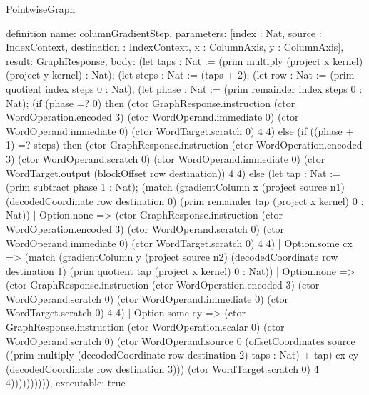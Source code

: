 \begin{lexlean}{PointwiseGraph}
\begin{semanticmodule}
definition{
  name: columnGradientStep,
  parameters: [index : Nat, source : IndexContext, destination : IndexContext, x : ColumnAxis, y : ColumnAxis],
  result: GraphResponse,
  body: (let taps : Nat := (prim multiply (project x kernel) (project y kernel) : Nat);
    (let steps : Nat := (taps + 2);
    (let row : Nat := (prim quotient index steps 0 : Nat);
    (let phase : Nat := (prim remainder index steps 0 : Nat);
    (if (phase =? 0) then (ctor GraphResponse.instruction (ctor WordOperation.encoded 3) (ctor WordOperand.immediate 0) (ctor WordOperand.immediate 0) (ctor WordTarget.scratch 0) 4 4) else (if ((phase + 1) =? steps) then (ctor GraphResponse.instruction (ctor WordOperation.encoded 3) (ctor WordOperand.scratch 0) (ctor WordOperand.immediate 0) (ctor WordTarget.output (blockOffset row destination)) 4 4) else (let tap : Nat := (prim subtract phase 1 : Nat); (match (gradientColumn x (project source n1) (decodedCoordinate row destination 0) (prim remainder tap (project x kernel) 0 : Nat))
      | Option.none => (ctor GraphResponse.instruction (ctor WordOperation.encoded 3) (ctor WordOperand.scratch 0) (ctor WordOperand.immediate 0) (ctor WordTarget.scratch 0) 4 4)
      | Option.some cx => (match (gradientColumn y (project source n2) (decodedCoordinate row destination 1) (prim quotient tap (project x kernel) 0 : Nat))
        | Option.none => (ctor GraphResponse.instruction (ctor WordOperation.encoded 3) (ctor WordOperand.scratch 0) (ctor WordOperand.immediate 0) (ctor WordTarget.scratch 0) 4 4)
        | Option.some cy => (ctor GraphResponse.instruction (ctor WordOperation.scalar 0) (ctor WordOperand.scratch 0) (ctor WordOperand.source 0 (offsetCoordinates source ((prim multiply (decodedCoordinate row destination 2) taps : Nat) + tap) cx cy (decodedCoordinate row destination 3))) (ctor WordTarget.scratch 0) 4 4)))))))))),
  executable: true
}


\end{semanticmodule}
\end{lexlean}
